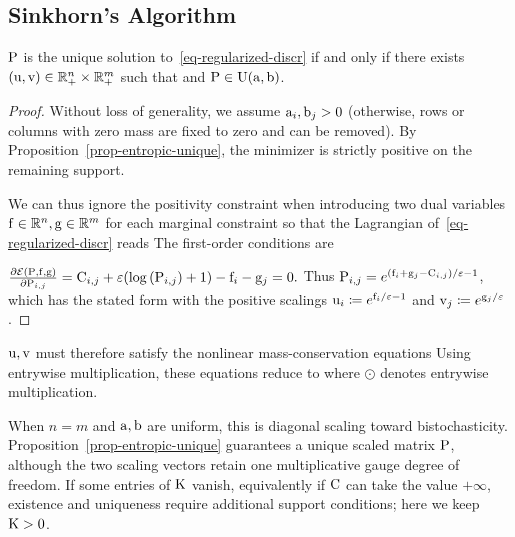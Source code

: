 \subsection{Sinkhorn's Algorithm}
\begin{prop}\label{prop-regularized-primal}
$\P$ is the unique solution to~\eqref{eq-regularized-discr} if and only if there exists $(\uD,\vD) \in \RR_+^n \times \RR_+^m$ such that
and $\P \in \CouplingsD(\a,\b)$.
\end{prop}
\begin{proof}
Without loss of generality, we assume $\a_i,\b_j>0$ (otherwise, rows or columns with zero mass are fixed to zero and can be removed). By Proposition~\ref{prop-entropic-unique}, the minimizer is strictly positive on the remaining support.

We can thus ignore the positivity constraint when introducing two dual variables $\fD\in\RR^n,\gD\in\RR^m$ for each marginal constraint so that the Lagrangian of~\eqref{eq-regularized-discr} reads
The first-order conditions are

\(\frac{\partial\Lag(\P,\fD,\gD)}{\partial \P_{i,j}}= \C_{i,j} + \epsilon (\log\pa{ \P_{i,j} }+1) - \fD_i -\gD_j = 0.\)
Thus
$\P_{i,j}=e^{(\fD_i+\gD_j-\C_{i,j})/\epsilon-1}$,
which has the stated form with the positive scalings
$\uD_i\eqdef e^{\fD_i/\epsilon-1}$ and $\vD_j\eqdef e^{\gD_j/\epsilon}$.
\end{proof}
$\uD,\vD$ must therefore satisfy the nonlinear mass-conservation equations
Using entrywise multiplication, these equations reduce to
\eql{\label{eq-dualsinkhorn-constraints2}
\uD \odot (\K \vD) = \a
\qandq
\vD \odot (\transp{\K}\uD) = \b
}
where $\odot$ denotes entrywise multiplication.

When $n=m$ and $\a,\b$ are uniform, this is diagonal scaling toward bistochasticity. Proposition~\ref{prop-entropic-unique} guarantees a unique scaled matrix $\P$, although the two scaling vectors retain one multiplicative gauge degree of freedom. If some entries of $\K$ vanish, equivalently if $\C$ can take the value $+\infty$, existence and uniqueness require additional support conditions; here we keep $\K>0$.

